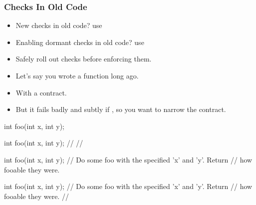 \begin{frame}[fragile]
  \frametitle{Checks In Old Code}
  \begin{itemize}\pause
  \item{New checks in old code?  use } \pause
  \item{Enabling dormant checks in old code?  use } \pause
  \end{itemize}
  \begin{itemize}
  \item{Safely roll out checks before enforcing them.}
  \end{itemize}
\end{frame}

\begin{frame}[fragile]
  \begin{overprint}
  \begin{itemize}
  \item<1->{Let's say you wrote a function long ago.}
  \item<3->{With a contract.}
  \item<5->{But it fails badly and subtly if , so you want to narrow the contract.}
  \end{itemize}
\end{overprint}

\begin{overprint}
\begin{cppcodebox}
int foo(int x, int y);
\end{cppcodebox}

\begin{cppcodebox}
int foo(int x, int y);
  // 
  // 
\end{cppcodebox}

\begin{cppcodebox}
int foo(int x, int y);
  // Do some foo with the specified 'x' and 'y'.  Return
  // how fooable they were.
\end{cppcodebox}

\begin{cppcodebox}
int foo(int x, int y);
  // Do some foo with the specified 'x' and 'y'.  Return
  // how fooable they were. 
  // 
\end{cppcodebox}

\end{overprint}
\end{frame}

